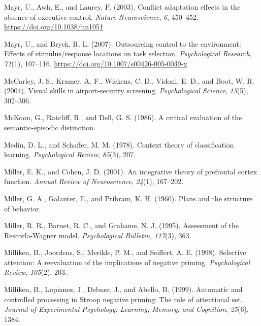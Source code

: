 \documentclass[]{DissertateCUNY}
\begin{document}
\leavevmode\hypertarget{ref-mayr_conflict_2003}{}%
Mayr, U., Awh, E., and Laurey, P. (2003). Conflict adaptation effects in
the absence of executive control. \emph{Nature Neuroscience}, \emph{6},
450--452. \url{https://doi.org/10.1038/nn1051}

\leavevmode\hypertarget{ref-mayr_outsourcing_2007}{}%
Mayr, U., and Bryck, R. L. (2007). Outsourcing control to the
environment: Effects of stimulus/response locations on task selection.
\emph{Psychological Research}, \emph{71}(1), 107--116.
\url{https://doi.org/10.1007/s00426-005-0039-x}

\leavevmode\hypertarget{ref-mccarley_visual_2004}{}%
McCarley, J. S., Kramer, A. F., Wickens, C. D., Vidoni, E. D., and Boot,
W. R. (2004). Visual skills in airport-security screening.
\emph{Psychological Science}, \emph{15}(5), 302--306.

\leavevmode\hypertarget{ref-mckoon_critical_1986}{}%
McKoon, G., Ratcliff, R., and Dell, G. S. (1986). A critical evaluation
of the semantic-episodic distinction.

\leavevmode\hypertarget{ref-medin_context_1978}{}%
Medin, D. L., and Schaffer, M. M. (1978). Context theory of
classification learning. \emph{Psychological Review}, \emph{85}(3), 207.

\leavevmode\hypertarget{ref-miller_integrative_2001}{}%
Miller, E. K., and Cohen, J. D. (2001). An integrative theory of
prefrontal cortex function. \emph{Annual Review of Neuroscience},
\emph{24}(1), 167--202.

\leavevmode\hypertarget{ref-miller_plans_1960}{}%
Miller, G. A., Galanter, E., and Pribram, K. H. (1960). Plans and the
structure of behavior.

\leavevmode\hypertarget{ref-miller_assessment_1995}{}%
Miller, R. R., Barnet, R. C., and Grahame, N. J. (1995). Assessment of
the Rescorla-Wagner model. \emph{Psychological Bulletin}, \emph{117}(3),
363.

\leavevmode\hypertarget{ref-milliken_selective_1998}{}%
Milliken, B., Joordens, S., Merikle, P. M., and Seiffert, A. E. (1998).
Selective attention: A reevaluation of the implications of negative
priming. \emph{Psychological Review}, \emph{105}(2), 203.

\leavevmode\hypertarget{ref-milliken_automatic_1999}{}%
Milliken, B., Lupianez, J., Debner, J., and Abello, B. (1999). Automatic
and controlled processing in Stroop negative priming: The role of
attentional set. \emph{Journal of Experimental Psychology: Learning,
Memory, and Cognition}, \emph{25}(6), 1384.
\end{document}

